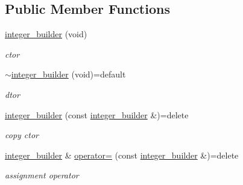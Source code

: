 \subsection*{Public Member Functions}
\begin{DoxyCompactItemize}
\item 
\mbox{\label{classcpp__redis_1_1builders_1_1integer__builder_a9ff2d3d27da0fb8b98fc4a0ea255fece}} 
\mbox{\hyperlink{classcpp__redis_1_1builders_1_1integer__builder_a9ff2d3d27da0fb8b98fc4a0ea255fece}{integer\+\_\+builder}} (void)
\begin{DoxyCompactList}\small\item\em ctor \end{DoxyCompactList}\item 
\mbox{\label{classcpp__redis_1_1builders_1_1integer__builder_ab2b797dd89b1bdec50f8ccf07633162f}} 
\mbox{\hyperlink{classcpp__redis_1_1builders_1_1integer__builder_ab2b797dd89b1bdec50f8ccf07633162f}{$\sim$integer\+\_\+builder}} (void)=default
\begin{DoxyCompactList}\small\item\em dtor \end{DoxyCompactList}\item 
\mbox{\label{classcpp__redis_1_1builders_1_1integer__builder_ab451b7fe5de8cf6f618cf9be1569aa41}} 
\mbox{\hyperlink{classcpp__redis_1_1builders_1_1integer__builder_ab451b7fe5de8cf6f618cf9be1569aa41}{integer\+\_\+builder}} (const \mbox{\hyperlink{classcpp__redis_1_1builders_1_1integer__builder}{integer\+\_\+builder}} \&)=delete
\begin{DoxyCompactList}\small\item\em copy ctor \end{DoxyCompactList}\item 
\mbox{\label{classcpp__redis_1_1builders_1_1integer__builder_a259905e8a34765d6ff9d2dd64f444b54}} 
\mbox{\hyperlink{classcpp__redis_1_1builders_1_1integer__builder}{integer\+\_\+builder}} \& \mbox{\hyperlink{classcpp__redis_1_1builders_1_1integer__builder_a259905e8a34765d6ff9d2dd64f444b54}{operator=}} (const \mbox{\hyperlink{classcpp__redis_1_1builders_1_1integer__builder}{integer\+\_\+builder}} \&)=delete
\begin{DoxyCompactList}\small\item\em assignment operator \end{DoxyCompactList}\item 

\end{DoxyCompactItemize}
